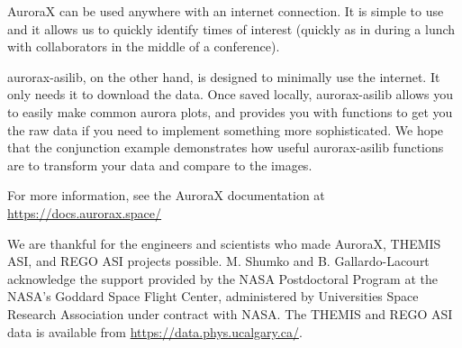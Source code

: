 \documentclass[draft]{agujournal2019}
\begin{document}
AuroraX can be used anywhere with an internet connection. It is simple to use and it allows us to quickly identify times of interest (quickly as in during a lunch with collaborators in the middle of a conference).

aurorax-asilib, on the other hand, is designed to minimally use the internet. It only needs it to download the data. Once saved locally, aurorax-asilib allows you to easily make common aurora plots, and provides you with functions to get you the raw data if you need to implement something more sophisticated. We hope that the conjunction example demonstrates how useful aurorax-asilib functions are to transform your data and compare to the images.

For more information, see the AuroraX documentation at \url{https://docs.aurorax.space/} 

\acknowledgments
We are thankful for the engineers and scientists who made AuroraX, THEMIS ASI, and REGO ASI projects possible. M. Shumko and B. Gallardo-Lacourt acknowledge the support provided by the NASA Postdoctoral Program at the NASA’s Goddard Space Flight Center, administered by Universities Space Research Association under contract with NASA. The THEMIS and REGO ASI data is available from \url{https://data.phys.ucalgary.ca/}.

% 
\end{document}
